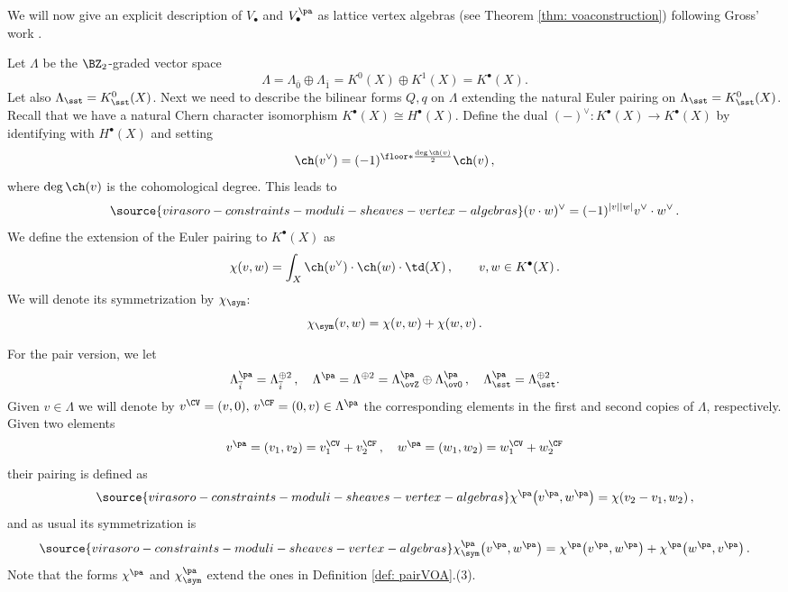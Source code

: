 We will now give an explicit description of $V_\bullet$ and $V^{\pa}_\bullet$ as lattice vertex algebras (see Theorem \ref{thm: voaconstruction}) following Gross' work \cite{Gr19}.

Let $\Lambda$ be the $\BZ_2$-graded vector space
\[\Lambda=\Lambda_{\overline{0}}\oplus \Lambda_{\overline{1}}=K^0(X)\oplus K^1(X)=K^\bullet(X).\]
Let also $\Lambda_\sst=K_\sst^0(X)$. Next we need to describe the bilinear forms $Q, q$ on $\Lambda$ extending the natural Euler pairing on $\Lambda_\sst=K_\sst^0(X)$. Recall that we have a natural Chern character isomorphism $K^\bullet(X)\cong H^\bullet(X)$.  Define the dual $(-)^\vee\colon K^\bullet(X)\to K^\bullet(X)$ by identifying with $H^\bullet(X)$ and setting
$$
\ch(v^\vee) = (-1)^{\floor*{ \frac{\deg\ch(v)}{2}}}\ch(v)\,,
$$
where $\deg\ch(v)$ is the cohomological degree. This leads to \begin{equation}
\label{Eq: splittingduals}
\source{virasoro-constraints-moduli-sheaves-vertex-algebras}
(v\cdot w)^\vee = (-1)^{|v||w|}v^\vee\cdot w^\vee\,.
\end{equation}
We define the extension of the Euler pairing to $K^\bullet(X)$ as
$$
\chi(v,w) = \int_X \ch(v^\vee)\cdot \ch(w)\cdot \td(X)\,,\qquad v,w\in K^\bullet(X)\,.
$$
We will denote its symmetrization by $\chi_\sym$:
\[\chi_\sym(v,w)=\chi(v,w)+\chi(w,v)\,.\]

For the pair version, we let
\[\Lambda^{\pa}_{\overline{i}} = \Lambda_{\overline{i}}^{\oplus 2}\,,\quad \Lambda^{\pa} =\Lambda^{\oplus 2}=\Lambda^{\pa}_{\ovZ}\oplus \Lambda^{\pa}_{\ovO}\,,\quad \Lambda^{\pa}_\sst=\Lambda_\sst^{\oplus 2}.\]
Given $v\in \Lambda$ we will denote by $v^\CV=(v,0),\, v^\CF=(0,v)\in \Lambda^{\pa}$ the corresponding elements in the first and second copies of $\Lambda$, respectively. Given two elements
\[v^{\pa}=(v_1, v_2)=v^\CV_1 + v^\CF_2\,,\quad w^{\pa}=(w_1, w_2)=w^\CV_1 + w^\CF_2\]
their pairing is defined as
\begin{equation}
\label{Eq: chipa}
\source{virasoro-constraints-moduli-sheaves-vertex-algebras}
\chi^{\pa}\big(v^{\pa},w^{\pa}\big) =  \chi(v_2-v_1,w_2) \,,
\end{equation}
and as usual its symmetrization is
\begin{equation}
\label{Eq: chipasym}
\source{virasoro-constraints-moduli-sheaves-vertex-algebras}
\chi^{\pa}_\sym\big(v^{\pa},w^{\pa}\big) = \chi^{\pa}\big(v^{\pa},w^{\pa}\big)+\chi^{\pa}\big(w^{\pa},v^{\pa}\big) \,.
\end{equation}
Note that the forms $\chi^{\pa}$ and $\chi^{\pa}_{\sym}$ extend the ones in Definition \ref{def: pairVOA}.(3).


